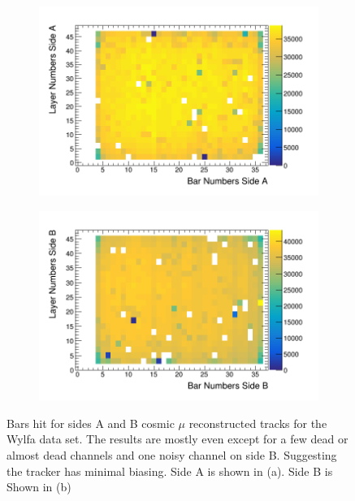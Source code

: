 \begin{figure}[!h]
\centering
\begin{subfigure}{.5\textwidth}
  \centering
  \includegraphics[width=\linewidth]{Chapter5/Figs/wylfaRasterNew/wylfaSideAHits.png}
  \captionsetup{width=.9\linewidth}
  \caption{}
  \label{subFig:wylfaSideAHits}
\end{subfigure}%
\begin{subfigure}{.5\textwidth}
  \centering
\includegraphics[width=\linewidth]{Chapter5/Figs/wylfaRasterNew/wylfaSideBHits.png}
  \captionsetup{width=.9\linewidth}
  \caption{}
  \label{subFig:wylfaSideBHits}
\end{subfigure}
\caption{Bars hit for sides A and B cosmic $\mu$ reconstructed tracks for the Wylfa data set. The results are mostly even except for a few dead or almost dead channels and one noisy channel on side B. Suggesting the tracker has minimal biasing. Side A is shown in (a). Side B is Shown in (b)}
\label{fig:wylfaSideABHits}
\end{figure}

